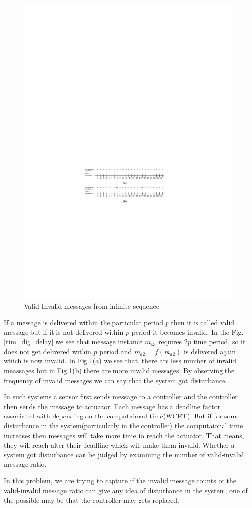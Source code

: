 \begin{figure}
\begin{center}
\includegraphics[width = 120mm]{valid_invalid.pdf}
\end{center}
\caption{Valid-Invalid messages from infinite sequence}
\label{tim_dig_cons}
\end{figure}


If a message is delivered within the particular period $p$ then it is called valid message but
if it is not delivered within $p$ period it becomes invalid. In the Fig.\ref{tim_dig_delay} we see that message
instance $m_{s3}$ requires $2p$ time period, so it does not get delivered within $p$ period and 
$m_{a2} = f(m_{a2})$ is delivered again which is now invalid. In Fig.\ref{tim_dig_cons}(a) we see that,
there are less number of invalid meassages but in Fig.\ref{tim_dig_cons}(b)  there are more invalid messages.
By observing the frequency of invalid messages we can say that the system got disturbance.

In such systems a sensor first sends message to a controller and the controller then sends the 
message to actuator. Each message has a deadline factor associated with depending on the computaional time(WCET).
But if for some disturbance in the system(particularly in the controller) the computaional time increases then
messages will take more time to reach the actuator. That means, they will reach after their deadline which will make them
invalid. Whether a system got disturbance can be judged by examining the number of valid-invalid message ratio.


In this problem, we are trying to capture if the invalid message counts or the valid-invalid message ratio can give any idea of 
disturbance in the system, one of the possible may be that the controller may gets replaced.








